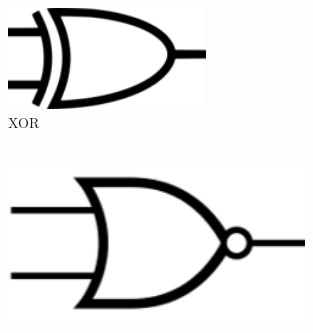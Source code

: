 \documentclass[
	10pt, %
	hmargin=1cm,vmargin=0cm,head=0.5cm,headsep=0pt,foot=0.5cm,margin=2cm
]{beamer}
\begin{document}
\begin{frame}
\begin{columns}[c]
		\begin{column}{0.45\textwidth} 
			\pause
			\begin{columns}[c]
				\begin{column}{0.3\textwidth} 
					\begin{figure}
						\includegraphics[width=0.7\textwidth]{xor.png}
						\caption{XOR}
					\end{figure}
				\end{column}
				\begin{column}{0.7\textwidth} 
					\begin{table}
					\end{table}
				\end{column}
			\end{columns}
			\pause
			\begin{columns}[c]
				\begin{column}{0.3\textwidth} 
					\begin{figure}
						\includegraphics[width=0.7\textwidth]{nor.png}

\end{figure}
\end{column}
\end{columns}
\end{column}
\end{columns}
\end{frame}
\end{document}
